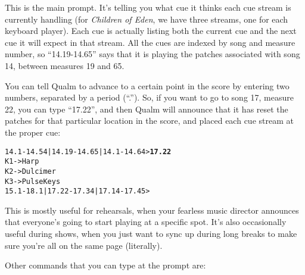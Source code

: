 \documentclass{article}
\newcommand{\q}{{\textsf{Qualm}}\xspace}
\begin{document}
This is the main prompt.  It's telling you what cue it thinks each cue
stream is currently handling (for {\em Children of Eden}, we have three
streams, one for each keyboard player).  Each cue is actually listing
both the current cue and the next cue it will expect in that stream. 
All the cues are indexed by song and measure number, so ``14.19-14.65''
says that it is playing the patches associated with song 14, between
measures 19 and 65.

You can tell \q to advance to a certain point in the score by
entering two numbers, separated by a period (``.'').  So, if you want to
go to song 17, measure 22, you can type ``17.22'', and then \q will
announce that it has reset the patches for that particular location in
the score, and placed each cue stream at the proper cue:


\begin{alltt}
    14.1-14.54 | 14.19-14.65 | 14.1-14.64> \textbf{17.22}
    K1 -> Harp
    K2 -> Dulcimer
    K3 -> Pulse Keys
    15.1-18.1 | 17.22-17.34 | 17.14-17.45>
\end{alltt}

This is mostly useful for rehearsals, when your fearless music
director announces that everyone's going to start playing at a specific
spot.  It's also occasionally useful during shows, when you just want
to sync up during long breaks to make sure you're all on the same page
(literally).

Other commands that you can type at the prompt are:
\end{document}
